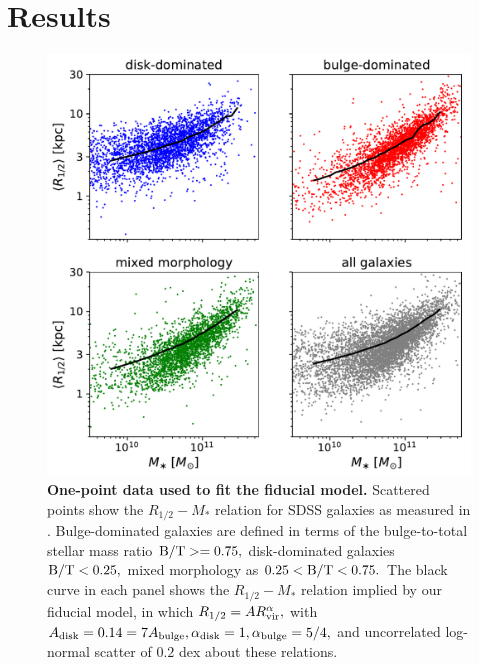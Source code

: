 \documentclass[usenatbib,usegraphicx,letterpaper]{mn2e}
\newcommand{\rhalf}{R_{1/2}}
\newcommand{\adisk}{A_{\rm disk}}
\newcommand{\abulge}{A_{\rm bulge}}
\newcommand{\alphadisk}{\alpha_{\rm disk}}
\newcommand{\alphabulge}{\alpha_{\rm bulge}}
\newcommand{\rvir}{R_{\rm vir}}
\newcommand{\bt}{{\rm B/T}}
\newcommand{\mstar}{M_{\ast}}
\begin{document}
\section{Results}
\label{sec:results}

\begin{figure}
\centering
\includegraphics[width=12cm]{FIGS/size_vs_stellar_mass_multipanel_bt_decomposition.pdf}
\caption{
{\bf One-point data used to fit the fiducial model.}
Scattered points show the $\rhalf-\mstar$ relation for SDSS galaxies as measured in \citet{meert_etal15}. Bulge-dominated galaxies are defined in terms of the bulge-to-total stellar mass ratio $\bt>=0.75,$ disk-dominated galaxies $\bt<0.25,$ mixed morphology as $0.25 < \bt < 0.75.$ The black curve in each panel shows the $\rhalf-\mstar$ relation implied by our fiducial model, in which $\rhalf=A\rvir^\alpha,$ with $\adisk=0.14=7\abulge, \alphadisk=1, \alphabulge=5/4,$ and uncorrelated log-normal scatter of $0.2$ dex about these relations. 
}
\label{fig:scatter_plot}
\end{figure}
\end{document}
